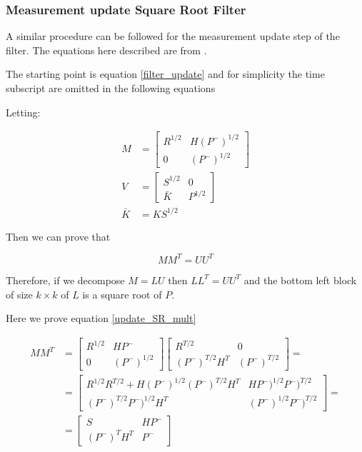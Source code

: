 \documentclass{article}
\begin{document}
\subsubsection{Measurement update Square Root Filter}

A similar procedure can be followed for the measurement update step of the filter. The equations here described are from \cite{dan_simon_optimal_2006}.

The starting point is equation \ref{filter_update} and for simplicity the time subscript are omitted in the following equations

Letting:

\begin{align}
    M &= \begin{bmatrix} R^{1/2} & H(P^-)^{1/2} \\ 0 & (P^-)^{1/2} \end{bmatrix} \\
    V &= \begin{bmatrix} S^{1/2} & 0 \\ \bar{K} & P^{1/2} \end{bmatrix} \\
    \bar{K} &= KS^{1/2}
\end{align}
    
Then we can prove that 

\begin{equation}\label{update_SR_mult}
    MM^T = UU^T
\end{equation}

Therefore, if we decompose $M=LU$ then $LL^T=UU^T$ and the bottom left block of size $k \times k$ of $L$ is a square root of $P$.

Here we prove equation \ref{update_SR_mult}

\begin{equation}
\begin{split}
    MM^T &= \begin{bmatrix} R^{1/2} & HP^- \\ 0 & (P^-)^{1/2} \end{bmatrix}\begin{bmatrix} R^{T/2} & 0 \\ (P^-)^{T/2}H^T & (P^-)^{T/2} \end{bmatrix}= \\
    &=\begin{bmatrix} R^{1/2}R^{T/2} + H(P^-)^{1/2}(P^-)^{T/2}H^T & HP^-)^{1/2}P^-)^{T/2} \\ (P^-)^{T/2}P^-)^{1/2}H^T & (P^-)^{1/2}P^-)^{T/2} \end{bmatrix} = \\
    &=\begin{bmatrix}S & HP^- \\ (P^-)^TH^T & P^- \end{bmatrix}
\end{split}
\end{equation}
\end{document}
